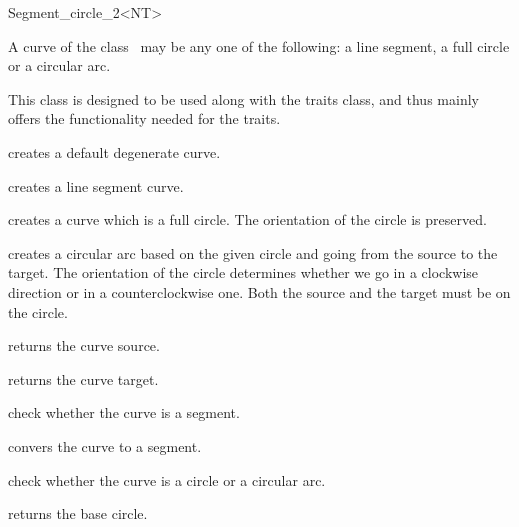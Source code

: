 
\ccRefPageBegin

\begin{ccRefClass}{Segment_circle_2<NT>} 
    
\ccDefinition A curve  of the class
    \ccClassTemplateName\ may be any one of the following: a line segment,
    a full circle or a circular arc.

    This class is designed to be used along with the
     traits class, and thus mainly
    offers the functionality needed for the traits.  

    
\ccCreation

	{creates a default degenerate curve.}

	{creates a line segment curve.}

	{creates a curve which is a full circle. The orientation of
	the circle is preserved.}

	{creates a circular arc based on the given circle and going
	from the source to the target. The orientation of the circle
	determines whether we go in a clockwise direction or in a
	counterclockwise one. Both the source and the target must be
	on the circle.}

\ccOperations
    
	{returns the curve source.}

	{returns the curve target.}

	{check whether the curve is a segment.}

	{convers the curve to a segment.
       	}

	{check whether the curve is a circle or a circular arc.}
    
	{returns the base circle.
       	}

\end{ccRefClass}


\ccRefPageEnd
